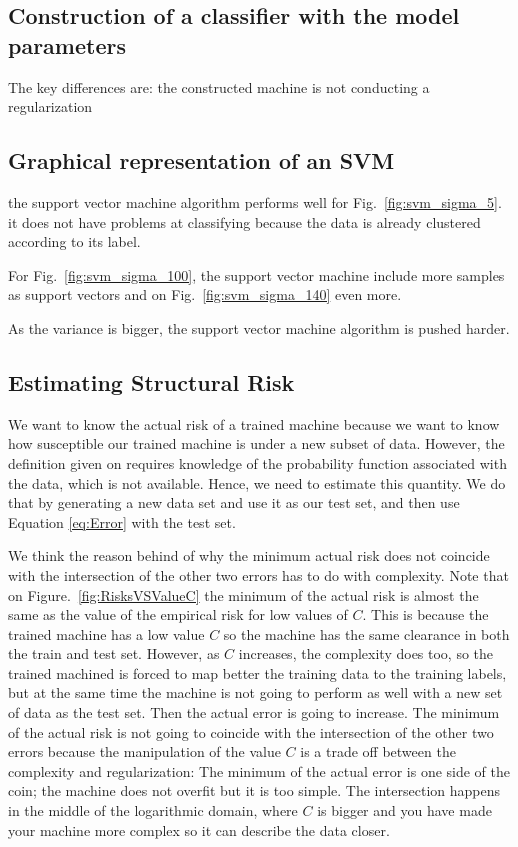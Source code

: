 \documentclass[letterpaper, 10 pt, conference]{ieeeconf}  %
\begin{document}
\subsection{Construction of a classifier with the model parameters}
\label{sec:ConclusionsConstructionClassifierModelParameters}

The key differences are: the constructed machine is not conducting a regularization

\subsection{Graphical representation of an SVM}
\label{sec:ConclusionsGraphicalRepresentationSVM}
    
the support vector machine algorithm performs well for  Fig.~\ref{fig:svm_sigma_5}. it does not have problems
at classifying because the data is already clustered according to its label.

For  Fig.~\ref{fig:svm_sigma_100}, the support vector machine include more samples as support vectors and  on Fig.~\ref{fig:svm_sigma_140} even more.

As the variance is bigger, the support vector machine algorithm is pushed harder.

 \subsection{Estimating Structural Risk}
 \label{sec:ConclusionEstimatingStructuralRisk}

We want to know the actual risk of a trained machine because we want to know how susceptible our trained machine is under a new
subset of data. However, the definition given on \cite{Burges1998} requires knowledge of the probability function associated with the
data, which is not available. Hence, we need to estimate this quantity. We do that by generating a new data set and use it as our test set, 
and then use Equation \ref{eq:Error} with the test set.

We think the reason behind of why the minimum actual risk does not coincide with the intersection of the other two errors has to do with 
complexity. Note that on Figure.~\ref{fig:RisksVSValueC} the minimum of the actual risk is almost the same as the value of the empirical risk 
for low values of $C$. This is because the trained machine has a low value $C$ so the machine has the same clearance in both the train and test 
set. However, as $C$ increases, the complexity does too, so the trained machined is forced to map better the training data to the training labels, 
but at the same time the machine is not going to perform as well with a new set of data as the test set. Then the actual error is going to increase.
The minimum of the actual risk is not going to coincide with the intersection of the other two errors because the manipulation of the value $C$ is
a trade off between the complexity and regularization: The minimum of the actual error is one side of the coin; the machine does not overfit but it
is too simple. The intersection happens in the middle of the logarithmic domain, where $C$ is bigger and you have made your machine more complex 
so it can describe the data closer. 
 
\end{document}
